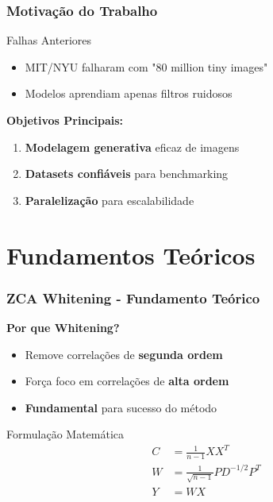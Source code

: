 \documentclass[aspectratio=169]{beamer}
\begin{document}
\begin{frame}
\frametitle{Motivação do Trabalho}
\begin{alertblock}{Falhas Anteriores}
\begin{itemize}
    \item MIT/NYU falharam com "80 million tiny images"
    \item Modelos aprendiam apenas filtros ruidosos
\end{itemize}
\end{alertblock}

\textbf{Objetivos Principais:}
\begin{enumerate}
    \item \textcolor{azulescuro}{\textbf{Modelagem generativa}} eficaz de imagens
    \item \textcolor{azulescuro}{\textbf{Datasets confiáveis}} para benchmarking  
    \item \textcolor{azulescuro}{\textbf{Paralelização}} para escalabilidade
\end{enumerate}
\end{frame}

\section{Fundamentos Teóricos}

\begin{frame}
\frametitle{ZCA Whitening - Fundamento Teórico}
\textbf{Por que Whitening?}
\begin{itemize}
    \item Remove correlações de \textcolor{azulescuro}{\textbf{segunda ordem}}
    \item Força foco em correlações de \textcolor{azulescuro}{\textbf{alta ordem}}
    \item \textcolor{azulescuro}{\textbf{Fundamental}} para sucesso do método
\end{itemize}

\begin{exampleblock}{Formulação Matemática}
\begin{align}
C &= \frac{1}{n-1} XX^T \\
W &= \frac{1}{\sqrt{n-1}} P D^{-1/2} P^T \\
Y &= WX
\end{align}
\end{exampleblock}
\end{frame}
\end{document}
